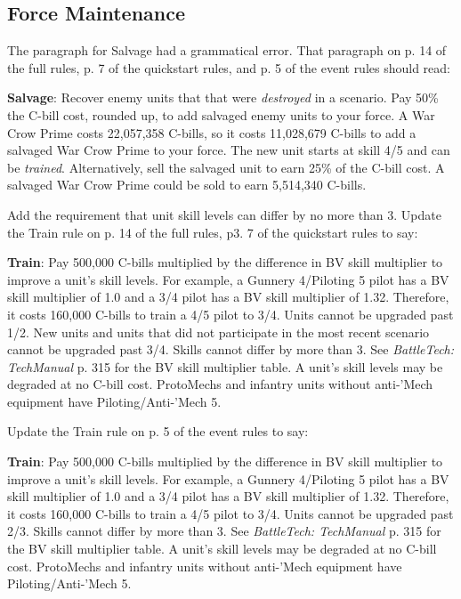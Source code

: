 \subsection{Force Maintenance}

The paragraph for Salvage had a grammatical error.
That paragraph on p. 14 of the full rules, p. 7 of the quickstart rules, and p. 5 of the event rules should read:

{\bfseries Salvage}: Recover enemy units that that were \emph{destroyed} in a scenario.
Pay 50\% the C-bill cost, rounded up, to add salvaged enemy units to your force.
A War Crow Prime costs 22,057,358 C-bills, so it costs 11,028,679 C-bills to add a salvaged War Crow Prime to your force.
The new unit starts at skill 4/5 and can be \emph{trained}.
Alternatively, sell the salvaged unit to earn 25\% of the C-bill cost.
A salvaged War Crow Prime could be sold to earn 5,514,340 C-bills.

Add the requirement that unit skill levels can differ by no more than 3.
Update the Train rule on p. 14 of the full rules, p3. 7 of the quickstart rules to say:

{\bfseries Train}: Pay 500,000 C-bills multiplied by the difference in BV skill multiplier to improve a unit's skill levels.
For example, a Gunnery 4/Piloting 5 pilot has a BV skill multiplier of 1.0 and a 3/4 pilot has a BV skill multiplier of 1.32.
Therefore, it costs 160,000 C-bills to train a 4/5 pilot to 3/4.
Units cannot be upgraded past 1/2.
New units and units that did not participate in the most recent scenario cannot be upgraded past 3/4.
Skills cannot differ by more than 3.
See \emph{BattleTech: TechManual} p. 315 for the BV skill multiplier table.
A unit's skill levels may be degraded at no C-bill cost.
ProtoMechs and infantry units without anti-'Mech equipment have Piloting/Anti-'Mech 5.

Update the Train rule on p. 5 of the event rules to say:

{\bfseries Train}: Pay 500,000 C-bills multiplied by the difference in BV skill multiplier to improve a unit's skill levels.
For example, a Gunnery 4/Piloting 5 pilot has a BV skill multiplier of 1.0 and a 3/4 pilot has a BV skill multiplier of 1.32.
Therefore, it costs 160,000 C-bills to train a 4/5 pilot to 3/4.
Units cannot be upgraded past 2/3.
Skills cannot differ by more than 3.
See \emph{BattleTech: TechManual} p. 315 for the BV skill multiplier table.
A unit's skill levels may be degraded at no C-bill cost.
ProtoMechs and infantry units without anti-'Mech equipment have Piloting/Anti-'Mech 5.

